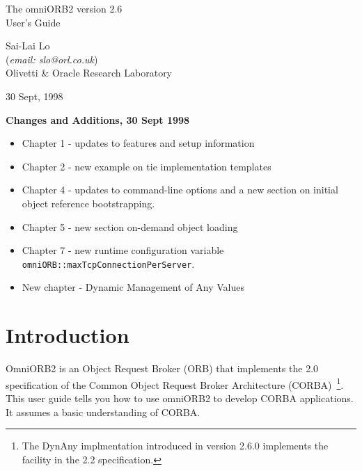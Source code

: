 \documentclass[11pt,twoside,onecolumn]{book}
\begin{document}
\pagestyle{empty}


\begin{center}

\vfill

{ \Huge
The omniORB2 version 2.6\\[4mm]
User's Guide
}

\vfill

{ \Large
Sai-Lai Lo\\
{\normalsize ({\it email: slo@orl.co.uk})}\\
Olivetti \& Oracle Research Laboratory\\
}


\vfill
\vfill
30 Sept, 1998
\vfill

\end{center}

\pagebreak

{\Large \bf \sf Changes and Additions, 30 Sept 1998}

\begin{itemize}
\item Chapter 1 - updates to features and setup information 
\item Chapter 2 - new example on tie implementation templates
\item Chapter 4 - updates to command-line options and a new section on
initial object reference bootstrapping.
\item Chapter 5 - new section on-demand object loading
\item Chapter 7 - new runtime configuration variable {\tt omniORB::maxTcpConnectionPerServer}.
\item New chapter - Dynamic Management of Any Values
\end{itemize}


\cleardoublepage
\tableofcontents
\cleardoublepage
\pagestyle{headings}


\mainmatter

%
\chapter{Introduction}

OmniORB2 is an Object Request Broker (ORB) that implements the 2.0
specification of the Common Object Request Broker Architecture
(CORBA)~\cite{corba2-spec}\footnote{The DynAny implmentation introduced in
version 2.6.0 implements the facility in the 2.2 specification.}.
This user guide tells you how to use omniORB2 to develop CORBA applications.
It assumes a basic understanding of CORBA. 
\end{document}
